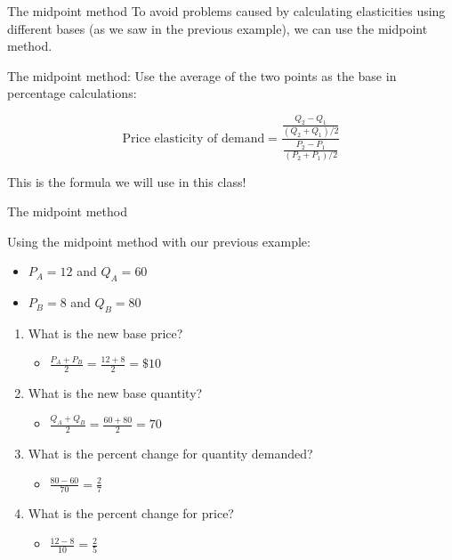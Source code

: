 \documentclass[compress]{beamer}
\begin{document}
\begin{frame}{The midpoint method}
    To avoid problems caused by calculating elasticities using different bases (as we saw in the previous example), we can use the midpoint method.

\medskip

\begin{block}{The midpoint method:}
Use the average of the two  points as the base in percentage calculations:

\[ \text{Price elasticity of demand} = \frac{\tfrac{Q_2 - Q_1}{(Q_2 + Q_1)/2}}{\tfrac{P_2 - P_1}{(P_2 + P_1)/2}} \]
\end{block}

\medskip

This is the formula we will use in this class!
\end{frame}
\begin{frame}{The midpoint method}
   \begin{block}{ Using the midpoint method with our previous example:}
    \begin{itemize}
        \item $P_A = 12$ and $Q_A = 60$
        \item $P_B = 8$ and $Q_B = 80$
    \end{itemize}
    \end{block}

    \begin{enumerate}
        \item What is the new base price?
            \begin{itemize}
                \item<2-> \(\frac{P_A + P_B}{2} = \frac{12+8}{2} = \$10\)
            \end{itemize}

        \item What is the new base quantity?
            \begin{itemize}
                \item<3-> \(\frac{Q_A + Q_B}{2} = \frac{60+80}{2} = 70\)
            \end{itemize}

        \item What is the percent change for quantity demanded?
            \begin{itemize}
                \item<4-> \(\frac{80-60}{70} = \frac{2}{7}\)
            \end{itemize}

        \item What is the percent change for price?
            \begin{itemize}
                \item<5-> \(\frac{12-8}{10} = \frac{2}{5}\)
            \end{itemize}
    \end{enumerate}

\end{frame}
\end{document}
